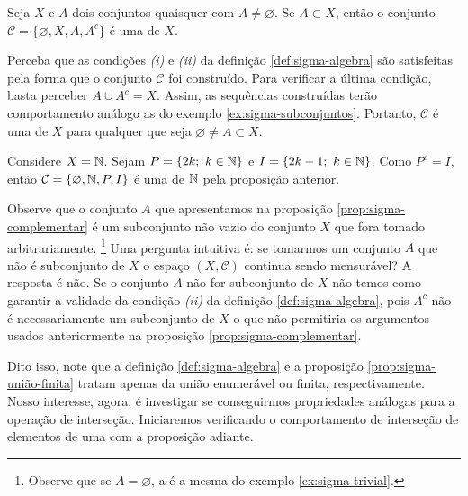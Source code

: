 
\begin{proposition}
\label{prop:sigma-complementar}
    Seja $X$ e $A$ dois conjuntos quaisquer com $A \neq \varnothing$.
    Se $A \subset X$, então o conjunto 
    $\mathcal{C}=\{\varnothing, X, A, A^c\}$ é uma \sigal de $X$.
\end{proposition}

\begin{prova}
    Perceba que as condições \textit{(i)} e \textit{(ii)} da definição \ref{def:sigma-algebra} são satisfeitas pela forma que o conjunto  $\mathcal{C}$ foi construído. Para verificar a última condição, basta perceber $A \cup A^c = X$. Assim, as sequências construídas terão comportamento análogo as do exemplo \ref{ex:sigma-subconjuntos}. Portanto, $\mathcal{C}$ é uma \sigal de $X$ para qualquer que seja $ \varnothing \neq A \subset X$.
\end{prova}

\begin{example}
    Considere $X = \operatorname{\mathbb{N}}$. 
    Sejam $P =\{2k; \ k \in \operatorname{\mathbb{N}}\}$ e $I = \{2k - 1;\ k \in \operatorname{\mathbb{N}}\}$. 
    Como $P^c = I$, então $\mathcal{C} = \{\varnothing, \operatorname{\mathbb{N}}, P, I\}$ é uma \sigal de $\operatorname{\mathbb{N}}$ pela proposição anterior.
\end{example}

Observe que o conjunto $A$ que apresentamos na proposição \ref{prop:sigma-complementar} é um subconjunto não vazio do conjunto $X$ que fora tomado arbitrariamente. 
\footnote{Observe que se $A = \varnothing$, a \sigal é a mesma do exemplo \ref{ex:sigma-trivial}.}
Uma pergunta intuitiva é: se tomarmos um conjunto $A$ que não é subconjunto de $X$ o espaço $(X, \mathcal{C})$ continua sendo mensurável? A resposta é não.
Se o conjunto $A$ não for subconjunto de $X$ não temos como garantir a validade da condição \textit{(ii)}  da definição \ref{def:sigma-algebra}, pois  $A^c$ não é necessariamente um subconjunto de $X$ o que não permitiria os argumentos usados anteriormente na proposição \ref{prop:sigma-complementar}.
 
Dito isso, note que a definição \ref{def:sigma-algebra} e a proposição \ref{prop:sigma-união-finita} tratam apenas da união enumerável ou finita, respectivamente. 
Nosso interesse, agora, é investigar se conseguirmos propriedades análogas para a operação de interseção. 
Iniciaremos verificando o comportamento de interseção de elementos de uma \sigal com a proposição adiante.

